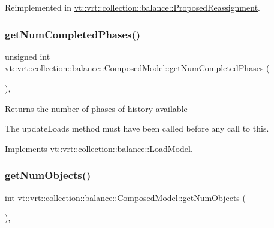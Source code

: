 Reimplemented in \hyperlink{structvt_1_1vrt_1_1collection_1_1balance_1_1_proposed_reassignment_aef7e98817093a99fbda1eaae7cb29f79}{vt\+::vrt\+::collection\+::balance\+::\+Proposed\+Reassignment}.

\mbox{\label{classvt_1_1vrt_1_1collection_1_1balance_1_1_composed_model_a2797ee7c1b39b815fe63279a7d67ed90}} 
\subsubsection{\texorpdfstring{get\+Num\+Completed\+Phases()}{getNumCompletedPhases()}}
{\footnotesize\ttfamily unsigned int vt\+::vrt\+::collection\+::balance\+::\+Composed\+Model\+::get\+Num\+Completed\+Phases (\begin{DoxyParamCaption}{ }\end{DoxyParamCaption})\hspace{0.3cm}{\ttfamily [override]}, {\ttfamily [virtual]}}

Returns the number of phases of history available

The {\ttfamily update\+Loads} method must have been called before any call to this. 

Implements \hyperlink{structvt_1_1vrt_1_1collection_1_1balance_1_1_load_model_a999b155237ce8ba253019e783462a9aa}{vt\+::vrt\+::collection\+::balance\+::\+Load\+Model}.

\mbox{\label{classvt_1_1vrt_1_1collection_1_1balance_1_1_composed_model_a7b383954706cb8069e841a87c3ff3f8f}} 
\subsubsection{\texorpdfstring{get\+Num\+Objects()}{getNumObjects()}}
{\footnotesize\ttfamily int vt\+::vrt\+::collection\+::balance\+::\+Composed\+Model\+::get\+Num\+Objects (\begin{DoxyParamCaption}{ }\end{DoxyParamCaption})\hspace{0.3cm}{\ttfamily [override]}, {\ttfamily [virtual]}}

